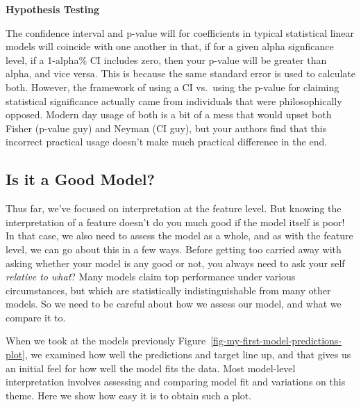 \documentclass[
  letterpaper,
]{krantz}
\begin{document}
\begin{tcolorbox}[enhanced jigsaw, colframe=quarto-callout-tip-color-frame, opacityback=0, breakable, left=2mm, rightrule=.15mm, toprule=.15mm, arc=.35mm, leftrule=.75mm, colback=white, bottomrule=.15mm]

\vspace{-3mm}\textbf{Hypothesis Testing}\vspace{3mm}

The confidence interval and p-value will for coefficients in typical
statistical linear models will coincide with one another in that, if for
a given alpha signficance level, if a 1-alpha\% CI includes zero, then
your p-value will be greater than alpha, and vice versa. This is because
the same standard error is used to calculate both. However, the
framework of using a CI vs.~using the p-value for claiming statistical
significance actually came from individuals that were philosophically
opposed. Modern day usage of both is a bit of a mess that would upset
both Fisher (p-value guy) and Neyman (CI guy), but your authors find
that this incorrect practical usage doesn't make much practical
difference in the end.

\end{tcolorbox}

\subsection{Is it a Good Model?}\label{sec-lm-interpretation-model}

Thus far, we've focused on interpretation at the feature level. But
knowing the interpretation of a feature doesn't do you much good if the
model itself is poor! In that case, we also need to assess the model as
a whole, and as with the feature level, we can go about this in a few
ways. Before getting too carried away with asking whether your model is
any good or not, you always need to ask your self \emph{relative to
what}? Many models claim top performance under various circumstances,
but which are statistically indistinguishable from many other models. So
we need to be careful about how we assess our model, and what we compare
it to.

When we took at the models previously
Figure~\ref{fig-my-first-model-predictions-plot}, we examined how well
the predictions and target line up, and that gives us an initial feel
for how well the model fits the data. Most model-level interpretation
involves assessing and comparing model fit and variations on this theme.
Here we show how easy it is to obtain such a plot.
\end{document}
